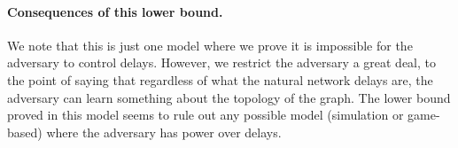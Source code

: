 \paragraph{Consequences of this lower bound.}
We note that this is just one model where we prove it is impossible for the adversary to control delays. However, we restrict the adversary a great deal, to the point of saying that regardless of what the natural network delays are, the adversary can learn something about the topology of the graph. The lower bound proved in this model seems to rule out any possible model (simulation or game-based) where the adversary has power over delays.



